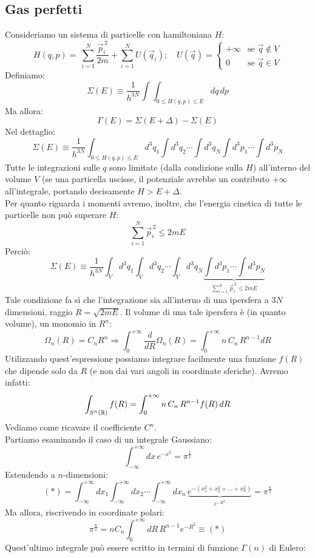 \documentclass[12pt]{article}
\begin{document}
\subsection{Gas perfetti}
Consideriamo un sistema di particelle con hamiltoniana $H$:
\[
H(q,p) =\ \sum_{i=1}^N \frac{\vec{p}_i^{\,2}}{2m}+\sum_{i=1}^N U(\vec{q}_i); \quad U(\vec{q}) = \begin{cases}
+\infty &\text{se } \vec{q}\notin V\\
0 &\text{se } \vec{q}\in V
\end{cases}
\]
Definiamo:
\[
\Sigma(E)\equiv \frac{1}{h^{3N}}\int \int_{0\leq H(q,p)\leq E} dq\,dp
\]
Ma allora:
\[
\Gamma(E) = \Sigma(E+\Delta)-\Sigma(E)
\]
Nel dettaglio:
\[
\Sigma(E) \equiv \frac{1}{h^{3N}} \int_{0\leq H(q,p)\leq E} d^3q_1\int d^3q_2\cdots \int d^3q_N\int d^3 p_1\cdots \int d^3p_N
\]
Tutte le integrazioni sulle $q$ sono limitate (dalla condizione sulla $H$) all'interno del volume $V$ (se una particella uscisse, il potenziale avrebbe un contributo $+\infty$ all'integrale, portando decisamente $H>E+\Delta$.\\
Per quanto riguarda i momenti avremo, inoltre, che l'energia cinetica di tutte le particelle non può superare $H$:
\[
\sum_{i=1}^N \vec{p}_i^{\,2}\leq 2mE
\]
Perciò:
\[
\Sigma(E) \equiv \frac{1}{h^{3N}} \int_V d^3q_1\int_V d^3q_2\cdots \int_V d^3q_N\underbrace{\int d^3 p_1\cdots \int d^3p_N}_{\sum_{i=1}^N \vec{p}_i^{\,2}\leq 2mE}
\]
Tale condizione fa sì che l'integrazione sia all'interno di una ipersfera a $3N$ dimensioni, raggio $R=\sqrt{2mE}$. Il volume di una tale ipersfera è (in quanto volume), un monomio in $R^n$:
\[
\Omega_n(R) = C_n R^n \Rightarrow \int_0^{+\infty} \frac{d}{dR}\Omega_n(R) = \int_0^{+\infty} n\, C_n\,R^{n-1}dR
\]
Utilizzando quest'espressione possiamo integrare facilmente una funzione $f(R)$ che dipende solo da $R$ (e non dai vari angoli in coordinate sferiche). Avremo infatti:
\[
\int_{S^n(\mathbb{R})} f(R) = \int_{0}^{+\infty} n\,C_n\,R^{n-1}f(R)\,dR
\]
Vediamo come ricavare il coefficiente $C^n$.\\
Partiamo esaminando il caso di un integrale Gaussiano:
\[
\int_{-\infty}^{+\infty} dx\,e^{-x^2} =\pi^{\frac{1}{2}}
\]
Estendendo a $n$-dimensioni:
\[
(*)=\int_{-\infty}^{+\infty} dx_1 \int_{-\infty}^{+\infty} dx_2 \cdots \int_{-\infty}^{+\infty} dx_n\, \underbrace{e^{-(x_1^2+x_2^2+\dots+x_n^2)}}_{e^{-R^2}}=\pi^{\frac{n}{2}}
\]
Ma allora, riscrivendo in coordinate polari:
\[
\pi^{\frac{n}{2}} = nC_n\int_0^{+\infty} dR\,R^{n-1}e^{-R^2}\equiv (*)
\]
Quest'ultimo integrale può essere scritto in termini di funzione $\Gamma(n)$ di Eulero:
\end{document}
